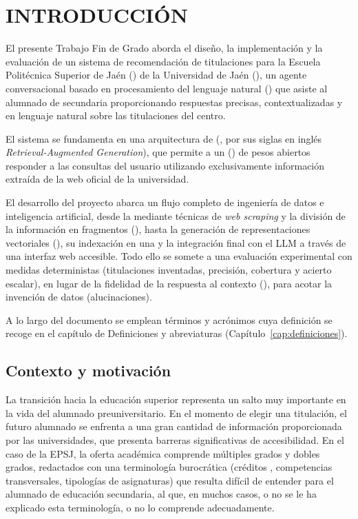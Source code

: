 \chapter{INTRODUCCIÓN}
\label{cap:introduccion}


El presente Trabajo Fin de Grado aborda el diseño, la implementación y la evaluación de un sistema de recomendación de 
titulaciones para la Escuela Politécnica Superior de Jaén () de la Universidad de Jaén (), un agente conversacional basado en procesamiento del lenguaje natural () que asiste al alumnado de secundaria proporcionando respuestas precisas, contextualizadas y en lenguaje natural sobre las titulaciones del centro.

El sistema se fundamenta en una arquitectura de  (, por sus siglas en inglés \textit{Retrieval-Augmented Generation}), que permite a un  () de pesos abiertos responder a las consultas del usuario utilizando exclusivamente información extraída de la web oficial de la universidad.

El desarrollo del proyecto abarca un flujo completo de ingeniería de datos e inteligencia artificial, desde la  mediante técnicas de \textit{web scraping} y la división de la información en fragmentos (), hasta la generación de representaciones vectoriales (), su indexación en una  y la integración final con el LLM a través de una interfaz web accesible. Todo ello se somete a una evaluación experimental con medidas deterministas (titulaciones inventadas, precisión, cobertura y acierto escalar), en lugar de la fidelidad de la respuesta al contexto (), para acotar la invención de datos (alucinaciones).


A lo largo del documento se emplean términos y acrónimos cuya definición se recoge en el capítulo de Definiciones y abreviaturas (Capítulo~\ref{cap:definiciones}).

\section{Contexto y motivación}

La transición hacia la educación superior representa un salto muy importante en la vida del alumnado preuniversitario. En el momento de elegir una titulación, el futuro alumnado se enfrenta a una gran cantidad de información proporcionada por las universidades, que presenta barreras significativas de accesibilidad. En el caso de la EPSJ, la oferta académica comprende múltiples grados y dobles grados, redactados con una terminología burocrática (créditos , competencias transversales, tipologías de asignaturas) que resulta difícil de entender para el alumnado de educación secundaria, al que, en muchos casos, o no se le ha explicado esta terminología, o no lo comprende adecuadamente.


